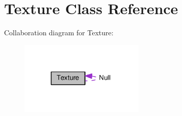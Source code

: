 \hypertarget{class_texture}{}\section{Texture Class Reference}
\label{class_texture}


Collaboration diagram for Texture\+:\nopagebreak
\begin{figure}[H]
\begin{center}
\leavevmode
\includegraphics[width=169pt]{class_texture__coll__graph}
\end{center}
\end{figure}
